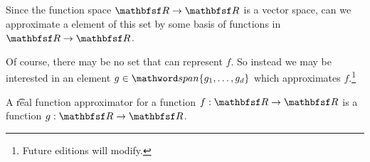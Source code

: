 

Since the function space $\R \to \R$ is a vector space, can we approximate a  element of this set by some basis of  functions in $\R \to \R$.

Of course, there may be no set that can represent $f$.
So instead we may be interested in an element $g \in \span\set{g_1, \dots, g_d}$ which approximates $f$.\footnote{Future editions will modify.}


A \t{real function approximator} for a function $f: \R \to \R$ is a function $g: \R \to \R$.

\blankpage
